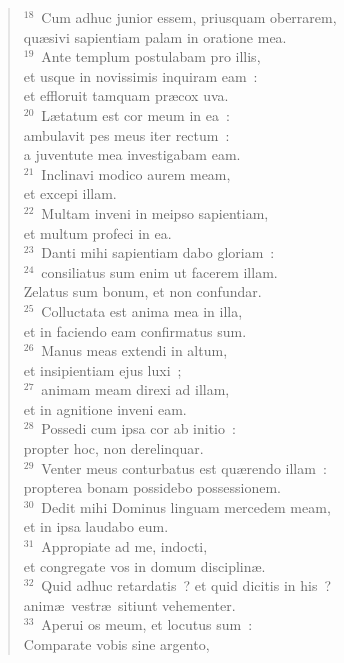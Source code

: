 \begin{verse}${}^{18}$~Cum adhuc junior essem, priusquam oberrarem,\\ qu\ae sivi sapientiam palam in oratione mea.\\
${}^{19}$~Ante templum postulabam pro illis,\\ et usque in novissimis inquiram eam~:\\ et effloruit tamquam pr\ae cox uva.\\
${}^{20}$~L\ae tatum est cor meum in ea~:\\ ambulavit pes meus iter rectum~:\\ a juventute mea investigabam eam.\\
${}^{21}$~Inclinavi modico aurem meam,\\ et excepi illam.\\
${}^{22}$~Multam inveni in meipso sapientiam,\\ et multum profeci in ea.\\
${}^{23}$~Danti mihi sapientiam dabo gloriam~:\\
${}^{24}$~consiliatus sum enim ut facerem illam.\\ Zelatus sum bonum, et non confundar.\\
${}^{25}$~Colluctata est anima mea in illa,\\ et in faciendo eam confirmatus sum.\\
${}^{26}$~Manus meas extendi in altum,\\ et insipientiam ejus luxi~;\\
${}^{27}$~animam meam direxi ad illam,\\ et in agnitione inveni eam.\\
${}^{28}$~Possedi cum ipsa cor ab initio~:\\ propter hoc, non derelinquar.\\
${}^{29}$~Venter meus conturbatus est qu\ae rendo illam~:\\ propterea bonam possidebo possessionem.\\
${}^{30}$~Dedit mihi Dominus linguam mercedem meam,\\ et in ipsa laudabo eum.\\
${}^{31}$~Appropiate ad me, indocti,\\ et congregate vos in domum disciplin\ae .\\
${}^{32}$~Quid adhuc retardatis~? et quid dicitis in his~?\\ anim\ae\ vestr\ae\ sitiunt vehementer.\\
${}^{33}$~Aperui os meum, et locutus sum~:\\ Comparate vobis sine argento,\\

\end{verse}
